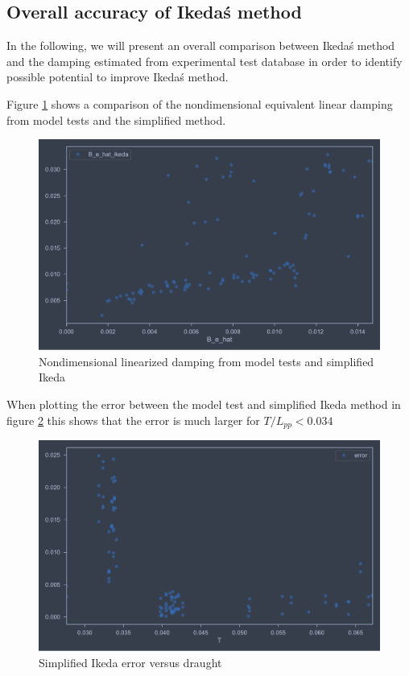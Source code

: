 \subsection{Overall accuracy of Ikeda\'s method}
\label{se:overall_comparison}
In the following, we will present an overall comparison between Ikeda\'s method and the damping estimated from experimental test database in order to identify possible potential to improve Ikeda\'s method.


Figure \ref{fig:B_e_hat_ikeda} shows a comparison of the nondimensional equivalent linear damping from model tests and the simplified method.  

\begin{figure}[H]
    \centering
    \includegraphics[width=\columnwidth]{figures/B_e_hat_ikeda.pdf}
    \caption{Nondimensional linearized damping from model tests and simplified Ikeda}
    \label{fig:B_e_hat_ikeda}
\end{figure}

When plotting the error between the model test and simplified Ikeda method in figure \ref{fig:B_e_hat_error} this shows that the error is much larger for $T/L_{pp}<0.034$

\begin{figure}[H]
    \centering
    \includegraphics[width=\columnwidth]{figures/B_e_hat_error.pdf}
    \caption{Simplified Ikeda error versus draught}
    \label{fig:B_e_hat_error}
\end{figure}


